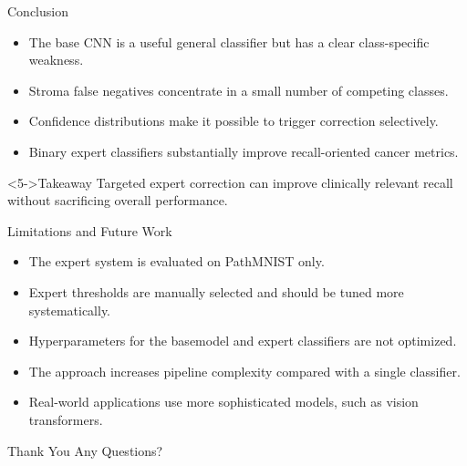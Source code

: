 \begin{frame}{Conclusion}
  \begin{itemize}
    \item<1-> The base CNN is a useful general classifier but has a clear class-specific weakness.
    \item<2-> Stroma false negatives concentrate in a small number of competing classes.
    \item<3-> Confidence distributions make it possible to trigger correction selectively.
    \item<4-> Binary expert classifiers substantially improve recall-oriented cancer metrics.
  \end{itemize}
  \begin{block}<5->{Takeaway}
    Targeted expert correction can improve clinically relevant recall without sacrificing overall performance.
  \end{block}
\end{frame}

\begin{frame}{Limitations and Future Work}
  \begin{itemize}
    \item<1-> The expert system is evaluated on PathMNIST only.
    \item<2-> Expert thresholds are manually selected and should be tuned more systematically.
    \item<3-> Hyperparameters for the basemodel and expert classifiers are not optimized.
    \item<4-> The approach increases pipeline complexity compared with a single classifier.
    \item<5-> Real-world applications use more sophisticated models, such as vision transformers.
  \end{itemize}
\end{frame}

\begin{frame}{Thank You}
  \centering
  \Large
  Any Questions?
\end{frame}
